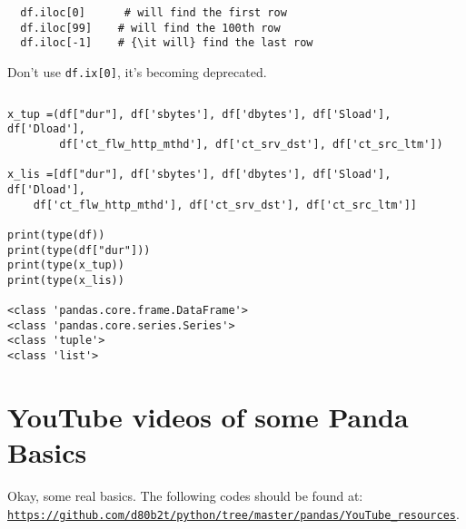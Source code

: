 \documentclass[11pt,a4paper]{article}
\begin{document}
\begin{lstlisting}
  df.iloc[0]      # will find the first row
  df.iloc[99]    # will find the 100th row
  df.iloc[-1]    # {\it will} find the last row
\end{lstlisting}
Don't use {\tt df.ix[0]}, it's becoming deprecated. \\

\begin{lstlisting}
\end{lstlisting}


\begin{lstlisting}
x_tup =(df["dur"], df['sbytes'], df['dbytes'], df['Sload'], df['Dload'],
        df['ct_flw_http_mthd'], df['ct_srv_dst'], df['ct_src_ltm'])

x_lis =[df["dur"], df['sbytes'], df['dbytes'], df['Sload'], df['Dload'],
    df['ct_flw_http_mthd'], df['ct_srv_dst'], df['ct_src_ltm']]

print(type(df))
print(type(df["dur"]))
print(type(x_tup))
print(type(x_lis))

<class 'pandas.core.frame.DataFrame'>
<class 'pandas.core.series.Series'>
<class 'tuple'>
<class 'list'>
\end{lstlisting}





\clearpage
\noindent
\section{YouTube videos of some Panda Basics}
Okay, some real basics. The following codes should be found at:\\
\href{https://github.com/d80b2t/python/tree/master/pandas/YouTube_resources}{{\tt https://github.com/d80b2t/python/tree/master/pandas/YouTube\_resources}}. 
\end{document}
